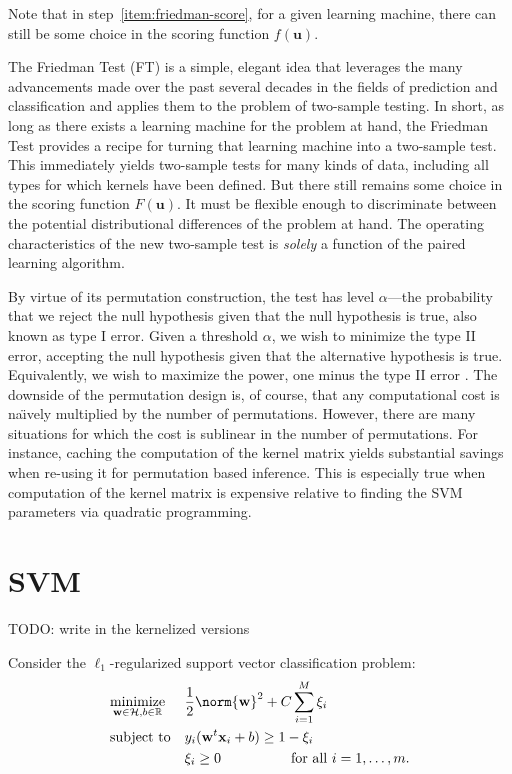 Note that in step~\ref{item:friedman-score}, for a given learning
machine, there can still be some choice in the scoring function
$f(\mathbf{u})$.

The Friedman Test (FT) is a simple, elegant idea that leverages the
many advancements made over the past several decades in the fields of
prediction and classification and applies them to the problem of
two-sample testing.  In short, as long as there exists a learning
machine for the problem at hand, the Friedman Test provides a recipe
for turning that learning machine into a two-sample test.  This
immediately yields two-sample tests for many kinds of data, including
all types for which kernels have been defined.
But there still remains some choice in the scoring
function $F(\mathbf{u})$.  It must be flexible enough to discriminate
between the potential distributional differences of the problem at
hand.  The operating characteristics of the new two-sample test is
\emph{solely} a function of the paired learning algorithm.

By virtue of its permutation construction, the test has level $\alpha$---the
probability that we reject the null hypothesis given
that the null hypothesis is true, also known as type I error.  Given a
threshold $\alpha$, we wish to minimize the type II error, accepting
the null hypothesis given that the alternative hypothesis is true.
Equivalently, we wish to maximize the power, one minus the type II
error \cite{lehmann2005testing}.  The downside of the permutation
design is, of course, that any computational cost is na\"\i vely
multiplied by the number of permutations.  However, there are many
situations for which the cost is sublinear in the number of
permutations.  For instance, caching the computation of the kernel matrix
yields substantial savings when re-using it for permutation based
inference.  This is especially true when computation of the kernel
matrix is expensive relative to finding the SVM parameters via
quadratic programming.

\section{SVM}
TODO: write in the kernelized versions

Consider the $\ell_1$-regularized support vector classification problem:
\begin{equation*}
\begin{aligned}
& \underset{\mathbf{w} \in \mathcal{H}, b \in \mathbb{R}}{\text{minimize}}
& &\frac{1}{2}\norm{\mathbf{w}}^2+C\sum_{i=1}^M \xi_i \\
& \text{subject to}
& & y_i(\mathbf{w}^t \mathbf{x}_i + b) \geq 1 - \xi_i \\
&&& \xi_i \geq 0 \qquad \qquad \quad \text{for all } i=1,\ldots,m.
\end{aligned}
\end{equation*}

